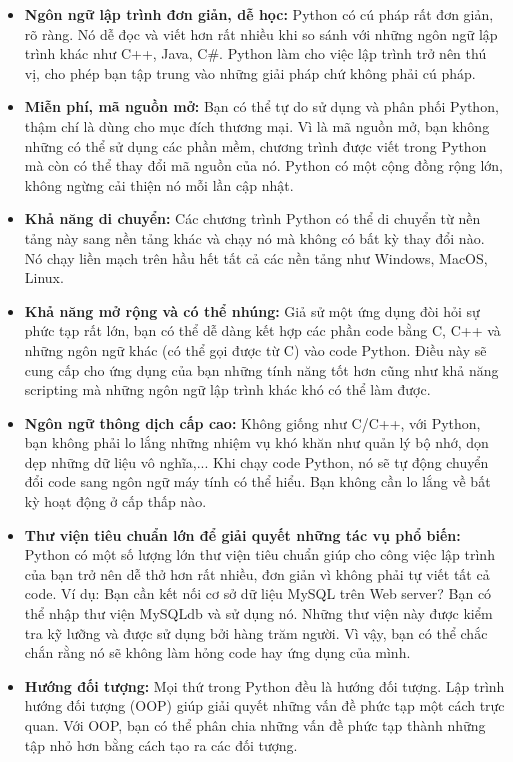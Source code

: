 \begin{itemize}
    \item \textbf{Ngôn ngữ lập trình đơn giản, dễ học:} Python có cú pháp rất đơn giản, rõ ràng. Nó dễ đọc và viết hơn rất nhiều khi so sánh với những ngôn ngữ lập trình khác như C++, Java, C\#. Python làm cho việc lập trình trở nên thú vị, cho phép bạn tập trung vào những giải pháp chứ không phải cú pháp.
    \item \textbf{Miễn phí, mã nguồn mở:} Bạn có thể tự do sử dụng và phân phối Python, thậm chí là dùng cho mục đích thương mại. Vì là mã nguồn mở, bạn không những có thể sử dụng các phần mềm, chương trình được viết trong Python mà còn có thể thay đổi mã nguồn của nó. Python có một cộng đồng rộng lớn, không ngừng cải thiện nó mỗi lần cập nhật.
    \item \textbf{Khả năng di chuyển:} Các chương trình Python có thể di chuyển từ nền tảng này sang nền tảng khác và chạy nó mà không có bất kỳ thay đổi nào. Nó chạy liền mạch trên hầu hết tất cả các nền tảng như Windows, MacOS, Linux.
    \item \textbf{Khả năng mở rộng và có thể nhúng:} Giả sử một ứng dụng đòi hỏi sự phức tạp rất lớn, bạn có thể dễ dàng kết hợp các phần code bằng C, C++ và những ngôn ngữ khác (có thể gọi được từ C) vào code Python. Điều này sẽ cung cấp cho ứng dụng của bạn những tính năng tốt hơn cũng như khả năng scripting mà những ngôn ngữ lập trình khác khó có thể làm được.
    \item \textbf{Ngôn ngữ thông dịch cấp cao:} Không giống như C/C++, với Python, bạn không phải lo lắng những nhiệm vụ khó khăn như quản lý bộ nhớ, dọn dẹp những dữ liệu vô nghĩa,... Khi chạy code Python, nó sẽ tự động chuyển đổi code sang ngôn ngữ máy tính có thể hiểu. Bạn không cần lo lắng về bất kỳ hoạt động ở cấp thấp nào.
    \item \textbf{Thư viện tiêu chuẩn lớn để giải quyết những tác vụ phổ biến:} Python có một số lượng lớn thư viện tiêu chuẩn giúp cho công việc lập trình của bạn trở nên dễ thở hơn rất nhiều, đơn giản vì không phải tự viết tất cả code. Ví dụ: Bạn cần kết nối cơ sở dữ liệu MySQL trên Web server? Bạn có thể nhập thư viện MySQLdb và sử dụng nó. Những thư viện này được kiểm tra kỹ lưỡng và được sử dụng bởi hàng trăm người. Vì vậy, bạn có thể chắc chắn rằng nó sẽ không làm hỏng code hay ứng dụng của mình.
    \item \textbf{Hướng đối tượng:} Mọi thứ trong Python đều là hướng đối tượng. Lập trình hướng đối tượng (OOP) giúp giải quyết những vấn đề phức tạp một cách trực quan. Với OOP, bạn có thể phân chia những vấn đề phức tạp thành những tập nhỏ hơn bằng cách tạo ra các đối tượng.
\end{itemize}
